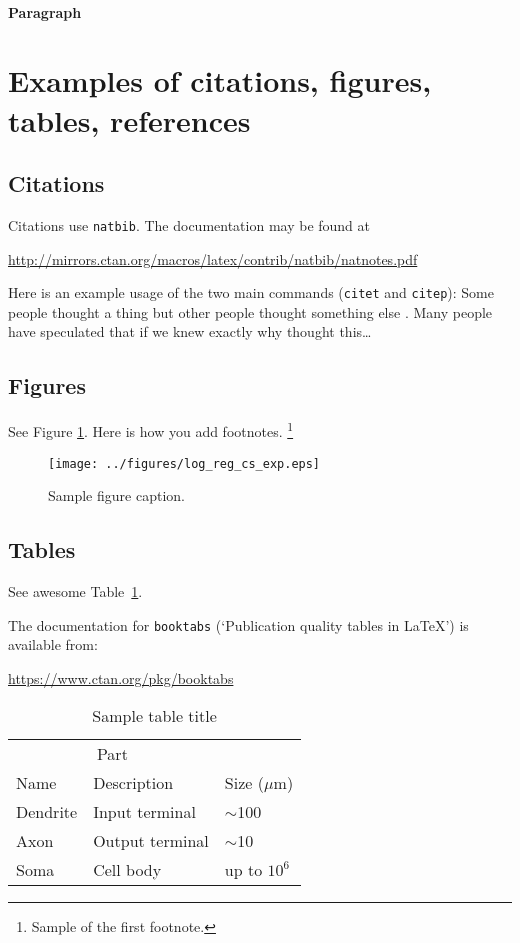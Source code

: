 \documentclass{article}
\begin{document}
\paragraph{Paragraph}
\lipsum[7]



\section{Examples of citations, figures, tables, references}
\label{sec:others}

\subsection{Citations}
Citations use \verb+natbib+. The documentation may be found at
\begin{center}
	\url{http://mirrors.ctan.org/macros/latex/contrib/natbib/natnotes.pdf}
\end{center}

Here is an example usage of the two main commands (\verb+citet+ and \verb+citep+): Some people thought a thing \citep{kour2014real, hadash2018estimate} but other people thought something else \citep{kour2014fast}. Many people have speculated that if we knew exactly why \citet{kour2014fast} thought this\dots

\subsection{Figures}
\lipsum[10]
See Figure \ref{fig:fig1}. Here is how you add footnotes. \footnote{Sample of the first footnote.}
\lipsum[11]

\begin{figure}
	\centering
	\texttt{[image: ../figures/log\_reg\_cs\_exp.eps]}
	\caption{Sample figure caption.}
	\label{fig:fig1}
\end{figure}

\subsection{Tables}
See awesome Table~\ref{tab:table}.

The documentation for \verb+booktabs+ (`Publication quality tables in LaTeX') is available from:
\begin{center}
	\url{https://www.ctan.org/pkg/booktabs}
\end{center}


\begin{table}
	\caption{Sample table title}
	\centering
	\begin{tabular}{lll}
		\toprule
		\multicolumn{2}{c}{Part}                   \\
		\cmidrule(r){1-2}
		Name     & Description     & Size ($\mu$m) \\
		\midrule
		Dendrite & Input terminal  & $\sim$100     \\
		Axon     & Output terminal & $\sim$10      \\
		Soma     & Cell body       & up to $10^6$  \\
		\bottomrule
	\end{tabular}
	\label{tab:table}
\end{table}
\end{document}
